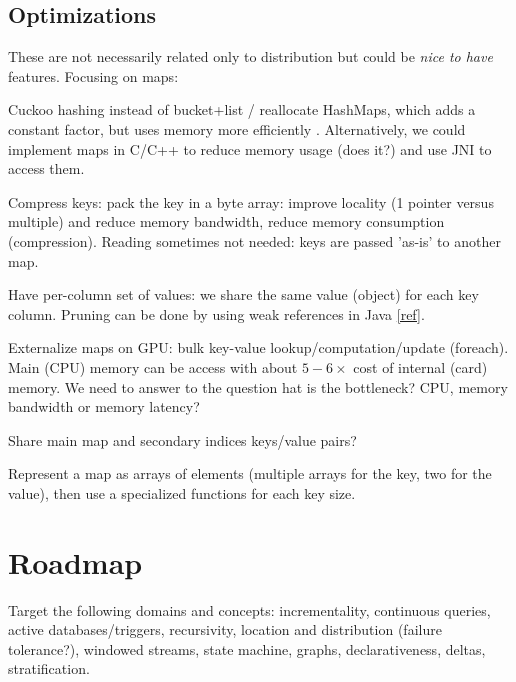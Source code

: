 \documentclass[10pt]{article}
\begin{document}
\subsection{Optimizations}
These are not necessarily related only to distribution but could be \textit{nice to have} features. Focusing on maps:
\ol
\item Cuckoo hashing instead of bucket+list / reallocate HashMaps, which adds a constant factor, but uses memory more efficiently \cite{gpu_hashing}. Alternatively, we could implement maps in C/C++ to reduce memory usage (does it?) and use JNI to access them.
\item Compress keys: pack the key in a byte array: improve locality (1 pointer versus multiple) and reduce memory bandwidth, reduce memory consumption (compression). Reading sometimes not needed: keys are passed 'as-is' to another map.
\item Have per-column set of values: we share the same value (object) for each key column. Pruning can be done by using weak references in Java \href{http://stackoverflow.com/questions/4062919/why-does-exist-weakhashmap-but-absent-weakset}{[ref]}.
\item Externalize maps on GPU: bulk key-value lookup/computation/update (foreach). Main (CPU) memory can be access with about $5-6\times $ cost of internal (card) memory. We need to answer to the question hat is the bottleneck? CPU, memory bandwidth or memory latency?
\item Share main map and secondary indices keys/value pairs?
\item Represent a map as arrays of elements (multiple arrays for the key, two for the value), then use a specialized functions for each key size.
\ole

\section{Roadmap}
Target the following domains and concepts: incrementality, continuous queries, active databases/triggers, recursivity, location and distribution (failure tolerance?), windowed streams, state machine, graphs, declarativeness, deltas, stratification.
\end{document}
